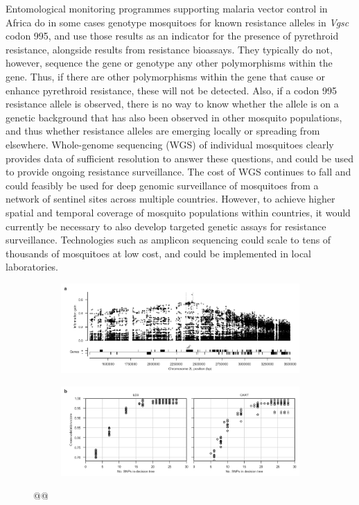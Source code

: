 \documentclass[a4paper,11pt,abstracton,hidelinks]{scrartcl}
\begin{document}
Entomological monitoring programmes supporting malaria vector control in Africa do in some cases genotype mosquitoes for known resistance alleles in \textit{Vgsc} codon 995, and use those results as an indicator for the presence of pyrethroid resistance, alongside results from resistance bioassays.
%
They typically do not, however, sequence the gene or genotype any other polymorphisms within the gene.
%
Thus, if there are other polymorphisms within the gene that cause or enhance pyrethroid resistance, these will not be detected.
%
Also, if a codon 995 resistance allele is observed, there is no way to know whether the allele is on a genetic background that has also been observed in other mosquito populations, and thus whether resistance alleles are emerging locally or spreading from elsewhere.
%
Whole-genome sequencing (WGS) of individual mosquitoes clearly provides data of sufficient resolution to answer these questions, and could be used to provide ongoing resistance surveillance.
%
The cost of WGS continues to fall and could feasibly be used for deep genomic surveillance of mosquitoes from a network of sentinel sites across multiple countries.
%
However, to achieve higher spatial and temporal coverage of mosquito populations within countries, it would currently be necessary to also develop targeted genetic assays for resistance surveillance.
%
Technologies such as amplicon sequencing could scale to tens of thousands of mosquitoes at low cost, and could be implemented in local laboratories.


\begin{figure}[t!]
\centering
\begin{subfigure}[t]{1\textwidth}
\includegraphics[width=1\linewidth,center]{artwork/chapter6/info_gain.png}
\end{subfigure}
\begin{subfigure}[t]{1\textwidth}
\includegraphics[width=1\linewidth,center]{artwork/chapter6/tree_cv.png}
\end{subfigure}
\caption{@@
}
\label{fig:dt}
\end{figure}
\end{document}
